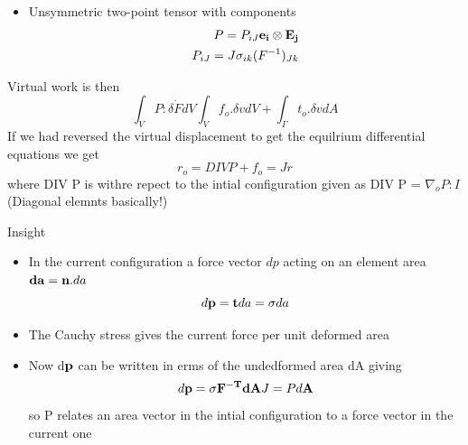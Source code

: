 	\begin{frame}
		\begin{itemize}
		\item Unsymmetric two-point tensor with components 
		\begin{equation}
		\begin{aligned}
		P = P_{iJ} \mathbf{e_i \otimes E_j}\\
		P_{iJ} = J\sigma_{ik}(F^{-1})_{Jk}
		\end{aligned}
		\end{equation}				
		\end{itemize}
			
	\begin{block}{}
		Virtual work is then
		\begin{equation}
		\int_V P:\delta \dot{F} dV  \int_V f_o.\delta v dV + \int_{\Gamma} t_o.\delta v dA
		\end{equation}
		If we had reversed the virtual displacement to get the equilrium differential equations we get 
		\begin{equation}
		r_o = DIV P + f_o = Jr
		\end{equation}
		where DIV P is withre repect to the intial configuration given as DIV P = $\nabla_o P :I$ (Diagonal elemnts basically!)
	\end{block}
	\end{frame}


	\begin{frame}{Insight}
		\begin{itemize}
			\item In the current configuration a force vector $dp$ acting on an element area $\mathbf{da = n.} da $
			\begin{equation}
				d\mathbf{p = t}da = \mathbf{\sigma} da
			\end{equation}
			\item The Cauchy stress gives the current force per unit deformed area 
			\item Now d$\mathbf{p}$ can be written in erms of the undedformed area dA giving
			\begin{equation}
				d\mathbf{p = \sigma F^{-T}dA}J =P d\mathbf{A}
			\end{equation}
			so P relates an area vector in the intial configuration to a force vector in the current one
		\end{itemize}
	\end{frame}


